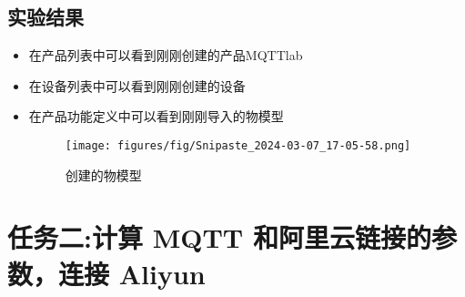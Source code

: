 \documentclass[12pt,hyperref,a4paper,UTF8]{ctexart}
\begin{document}
\subsection{实验结果}
\begin{itemize}
    \item 在产品列表中可以看到刚刚创建的产品MQTTlab
    \item 在设备列表中可以看到刚刚创建的设备
    \item 在产品功能定义中可以看到刚刚导入的物模型
    \begin{figure}[H]
        \centering
        \texttt{[image: figures/fig/Snipaste\_2024-03-07\_17-05-58.png]}
        \caption{创建的物模型}
        \label{fig:enter-label}
    \end{figure} 
\end{itemize}




\section{任务二:计算 MQTT 和阿里云链接的参数，连接 Aliyun}
\end{document}
